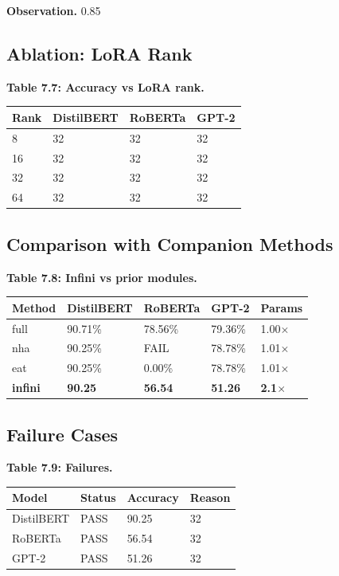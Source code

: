 \textbf{Observation.} 0.85

\subsection{Ablation: LoRA Rank}

\textbf{Table 7.7: Accuracy vs LoRA rank.}

\begin{table}[H]
\centering
\small
\begin{tabular}{llll}
\toprule
\textbf{Rank} & \textbf{DistilBERT} & \textbf{RoBERTa} & \textbf{GPT-2} \\
\midrule
8 & 32 & 32 & 32 \\
16 & 32 & 32 & 32 \\
32 & 32 & 32 & 32 \\
64 & 32 & 32 & 32 \\
\bottomrule
\end{tabular}
\end{table}

\subsection{Comparison with Companion Methods}

\textbf{Table 7.8: Infini vs prior modules.}

\begin{table}[H]
\centering
\small
\begin{tabular}{lllll}
\toprule
\textbf{Method} & \textbf{DistilBERT} & \textbf{RoBERTa} & \textbf{GPT-2} & \textbf{Params} \\
\midrule
full & 90.71\% & 78.56\% & 79.36\% & 1.00$\times$ \\
nha & 90.25\% & FAIL & 78.78\% & 1.01$\times$ \\
eat & 90.25\% & 0.00\% & 78.78\% & 1.01$\times$ \\
\textbf{infini} & \textbf{90.25} & \textbf{56.54} & \textbf{51.26} & \textbf{2.1$\times$} \\
\bottomrule
\end{tabular}
\end{table}

\subsection{Failure Cases}

\textbf{Table 7.9: Failures.}

\begin{table}[H]
\centering
\small
\begin{tabular}{llll}
\toprule
\textbf{Model} & \textbf{Status} & \textbf{Accuracy} & \textbf{Reason} \\
\midrule
DistilBERT & PASS & 90.25 & 32 \\
RoBERTa & PASS & 56.54 & 32 \\
GPT-2 & PASS & 51.26 & 32 \\
\bottomrule
\end{tabular}
\end{table}

